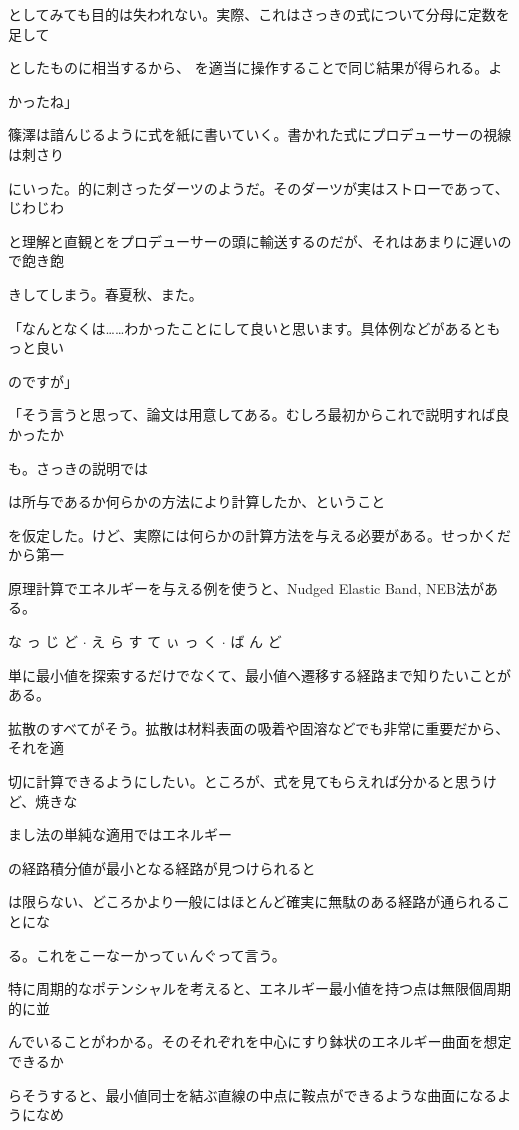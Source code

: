 としてみても⽬的は失われない。実際、これはさっきの式について分母に定数を⾜して\par
としたものに相当するから、  を適当に操作することで同じ結果が得られる。よ\par
かったね」\par
篠澤は諳んじるように式を紙に書いていく。書かれた式にプロデューサーの視線は刺さり\par
にいった。的に刺さったダーツのようだ。そのダーツが実はストローであって、じわじわ\par
と理解と直観とをプロデューサーの頭に輸送するのだが、それはあまりに遅いので飽き飽\par
きしてしまう。春夏秋、また。\par
「なんとなくは……わかったことにして良いと思います。具体例などがあるともっと良い\par
のですが」\par
「そう⾔うと思って、論⽂は⽤意してある。むしろ最初からこれで説明すれば良かったか\par
も。さっきの説明では\par
は所与であるか何らかの⽅法により計算したか、ということ\par
を仮定した。けど、実際には何らかの計算⽅法を与える必要がある。せっかくだから第⼀\par
原理計算でエネルギーを与える例を使うと、Nudged Elastic Band, NEB法がある。\par
な っ じ ど $\cdot$ え ら す て ぃ っ く $\cdot$ ば ん ど\par
単に最⼩値を探索するだけでなくて、最⼩値へ遷移する経路まで知りたいことがある。\par
拡散のすべてがそう。拡散は材料表⾯の吸着や固溶などでも⾮常に重要だから、それを適\par
切に計算できるようにしたい。ところが、式を⾒てもらえれば分かると思うけど、焼きな\par
まし法の単純な適⽤ではエネルギー\par
の経路積分値が最⼩となる経路が⾒つけられると\par
は限らない、どころかより⼀般にはほとんど確実に無駄のある経路が通られることにな\par
る。これをこーなーかってぃんぐって⾔う。\par
特に周期的なポテンシャルを考えると、エネルギー最⼩値を持つ点は無限個周期的に並\par
んでいることがわかる。そのそれぞれを中⼼にすり鉢状のエネルギー曲⾯を想定できるか\par
らそうすると、最⼩値同⼠を結ぶ直線の中点に鞍点ができるような曲⾯になるようになめ\par
